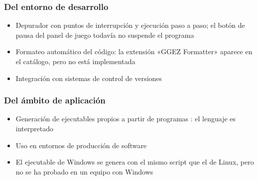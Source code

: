 \subsubsection*{Del entorno de desarrollo}
\begin{itemize}
  \item Depurador con puntos de interrupción y ejecución paso a paso; el botón de pausa del panel de juego todavía no suspende el programa
  \item Formateo automático del código: la extensión «GGEZ Formatter» aparece en el catálogo, pero no está implementada
  \item Integración con sistemas de control de versiones
\end{itemize}

\subsubsection*{Del ámbito de aplicación}
\begin{itemize}
  \item Generación de ejecutables propios a partir de programas \ggez: el lenguaje es interpretado
  \item Uso en entornos de producción de software
  \item El ejecutable de Windows se genera con el mismo script que el de Linux, pero no se ha probado en un equipo con Windows
\end{itemize}

\newpage





